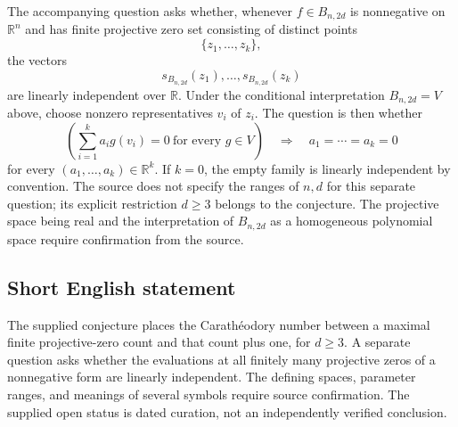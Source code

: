 \documentclass[11pt]{article}
\newcommand{\R}{\mathbb{R}}
\begin{document}
The accompanying question asks whether, whenever \(f\in B_{n,2d}\) is nonnegative on \(\R^n\) and has finite projective zero set consisting of distinct points
\[
 \{z_1,\ldots,z_k\},
\]
the vectors
\[
 s_{B_{n,2d}}(z_1),\ldots,s_{B_{n,2d}}(z_k)
\]
are linearly independent over \(\R\). Under the conditional interpretation \(B_{n,2d}=V\) above, choose nonzero representatives \(v_i\) of \(z_i\). The question is then whether
\[
 \left(\sum_{i=1}^{k}a_i g(v_i)=0\ \text{for every }g\in V\right)
 \quad\Longrightarrow\quad a_1=\cdots=a_k=0
\]
for every \((a_1,\ldots,a_k)\in\R^k\). If \(k=0\), the empty family is linearly independent by convention. The source does not specify the ranges of \(n,d\) for this separate question; its explicit restriction \(d\geq3\) belongs to the conjecture. The projective space being real and the interpretation of \(B_{n,2d}\) as a homogeneous polynomial space require confirmation from the source.
\subsection{Short English statement}
The supplied conjecture places the Carath\'{e}odory number between a maximal finite projective-zero count and that count plus one, for \(d\geq3\). A separate question asks whether the evaluations at all finitely many projective zeros of a nonnegative form are linearly independent. The defining spaces, parameter ranges, and meanings of several symbols require source confirmation. The supplied open status is dated curation, not an independently verified conclusion.
\end{document}
